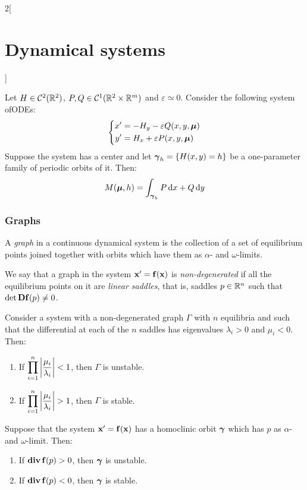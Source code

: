 \documentclass[../../../main_math.tex]{subfiles}
\begin{document}
\begin{multicols}{2}[\section{Dynamical systems}]
\begin{theorem}
  \end{theorem}
  \begin{corollary}
    Let $H\in\mathcal{C}^2(\mathbb{R}^2)$, $P,Q\in\mathcal{C}^1(\mathbb{R}^2\times\mathbb{R}^m)$ and $\varepsilon\simeq 0$. Consider the following system ofODEs:
    \begin{equation*}
      \left\{
      \begin{aligned}
        x' & =-H_y -\varepsilon Q(x,y,\boldsymbol{\mathrm{\mu}}) \\
        y' & =H_x +\varepsilon P(x,y,\boldsymbol{\mathrm{\mu}})
      \end{aligned}
      \right.
    \end{equation*}
    Suppose the system has a center and let $\boldsymbol{\mathrm{\gamma}}_h=\{H(x,y)=h\}$ be a one-parameter family of periodic orbits of it. Then: $$M(\boldsymbol{\mathrm{\mu}},h)=\int_{\boldsymbol{\mathrm{\gamma}}_h}P\dd{x}+Q\dd{y}$$
  \end{corollary}
  \subsubsection{Graphs}
  \begin{definition}
    A \emph{graph} in a continuous dynamical system is the collection of a set of equilibrium points joined together with orbits which have them as $\alpha$- and $\omega$-limits.
  \end{definition}
  \begin{definition}
    We say that a graph in the system $\boldsymbol{\mathrm{x}}'=\boldsymbol{\mathrm{f}}(\boldsymbol{\mathrm{x}})$ is \emph{non-degenerated} if all the equilibrium points on it are \emph{linear saddles}, that is, saddles $p\in\mathbb{R}^n$ such that $\det\boldsymbol{\mathrm{Df}}(p)\ne 0$.
  \end{definition}
  \begin{proposition}
    Consider a system with a non-degenerated graph $\Gamma$ with $n$ equilibria and such that the differential at each of the $n$ saddles has eigenvalues $\lambda_i > 0$ and $\mu_i<0$. Then:
    \begin{enumerate}
      \item If $\displaystyle\prod_{i=1}^n\abs{\frac{\mu_i}{\lambda_i}}<1$, then $\Gamma$ is unstable.
      \item If $\displaystyle\prod_{i=1}^n\abs{\frac{\mu_i}{\lambda_i}}>1$, then $\Gamma$ is stable.
    \end{enumerate}
  \end{proposition}
  \begin{corollary}
    Suppose that the system $\boldsymbol{\mathrm{x}}'=\boldsymbol{\mathrm{f}}(\boldsymbol{\mathrm{x}})$ has a homoclinic orbit $\boldsymbol{\mathrm{\gamma}}$ which has $p$ as $\alpha$- and $\omega$-limit. Then:
    \begin{enumerate}
      \item If $\operatorname{\boldsymbol{\mathrm{div}}} \boldsymbol{\mathrm{f}}(p)>0$, then $\boldsymbol{\mathrm{\gamma}}$ is unstable.
      \item If $\operatorname{\boldsymbol{\mathrm{div}}} \boldsymbol{\mathrm{f}}(p)<0$, then $\boldsymbol{\mathrm{\gamma}}$ is stable.
    \end{enumerate}
  \end{corollary}

\end{multicols}
\end{document}
